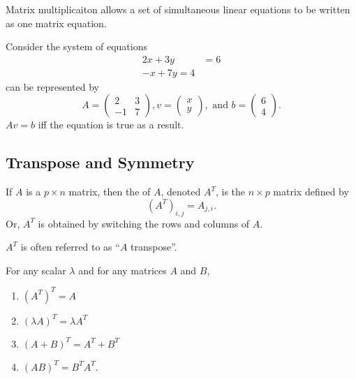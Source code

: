 Matrix multiplicaiton allows a set of simultaneous linear equations to be written as one matrix equation. 

\begin{example}
  Consider the system of equations
  \begin{align*}
    2x + 3y &= 6 \\ 
    -x + 7y = 4
  \end{align*}
  can be represented by 
  \begin{equation*}
    A = \begin{pmatrix} 2 & 3 \\ -1 & 7 \end{pmatrix}, v = \begin{pmatrix} x \\ y \end{pmatrix}, \text{ and } b = \begin{pmatrix}     6 \\ 4 \end{pmatrix}.
  \end{equation*}
  $Av = b$ iff the equation is true as a result.
\end{example}

\subsection{Transpose and Symmetry}
\begin{definition}
  If $A$ is a $p \times n$ matrix, then the  of $A$, denoted $A^{T}$, is the $n \times p$ matrix defined by
  \begin{equation*}
    \left(A^{T}\right)_{i, j} = A_{j, i}.
  \end{equation*}
  Or, $A^{T}$ is obtained by switching the rows and columns of $A$.
\end{definition}

 $A^{T}$ is often referred to as ``$A$ transpose''.

 \begin{theorem}
   For any scalar $\lambda$ and for any matrices $A$ and $B$, 
   \begin{enumerate}
     \item $\left(A^{T}\right)^{T} = A$
     \item $\left(\lambda A\right)^{T} = \lambda A^{T}$
     \item $\left(A + B\right)^{T} = A^{T} + B^{T}$
     \item $\left(AB\right)^{T} = B^{T}A^{T}$.
   \end{enumerate}
 \end{theorem}

